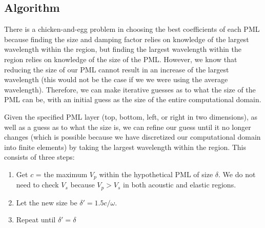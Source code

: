 \subsection{Algorithm}

There is a chicken-and-egg problem in choosing the best coefficients of each PML because finding the size and damping factor relies on knowledge of the largest wavelength within the region, but finding the largest wavelength within the region relies on knowledge of the size of the PML. However, we know that reducing the size of our PML cannot result in an increase of the largest wavelength (this would not be the case if we we were using the average wavelength). Therefore, we can make iterative guesses as to what the size of the PML can be, with an initial guess as the size of the entire computational domain.

Given the specified PML layer (top, bottom, left, or right in two dimensions), as well as a guess as to what the size is, we can refine our guess until it no longer changes (which is possible because we have discretized our computational domain into finite elements) by taking the largest wavelength within the region. This consists of three steps:

\begin{enumerate}
\item Get $c$ = the maximum $V_p$ within the hypothetical PML of size $\delta$. We do not need to check $V_s$ because $V_p > V_s$ in both acoustic and elastic regions.
\item Let the new size be $\delta' = 1.5 c / \omega$.
\item Repeat until $\delta' = \delta$
\end{enumerate}

\newpage
